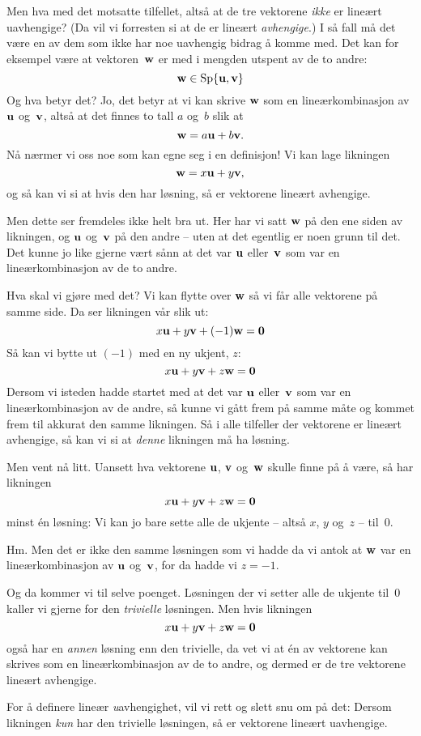 Men hva med det motsatte tilfellet, altså at de tre vektorene
\emph{ikke} er lineært uavhengige?  (Da vil vi forresten si at de er
lineært \emph{avhengige}.)  I så fall må det være en av dem som ikke
har noe uavhengig bidrag å komme med.  Det kan for eksempel være at
vektoren~$\mathbf{w}$ er med i mengden utspent av de to andre:
\[
\mathbf{w} \in \operatorname{Sp}\{ \mathbf{u}, \mathbf{v} \}
\]
Og hva betyr det?  Jo, det betyr at vi kan skrive $\mathbf{w}$ som en
lineærkombinasjon av $\mathbf{u}$ og~$\mathbf{v}$, altså at det finnes to tall $a$
og~$b$ slik at
\[
\mathbf{w} = a\mathbf{u} + b\mathbf{v}.
\]
Nå nærmer vi oss noe som kan egne seg i en definisjon!  Vi kan lage
likningen
\[
\mathbf{w} = x\mathbf{u} + y\mathbf{v},
\]
og så kan vi si at hvis den har løsning, så er vektorene lineært
avhengige.

Men dette ser fremdeles ikke helt bra ut.  Her har vi satt $\mathbf{w}$ på den
ene siden av likningen, og $\mathbf{u}$ og~$\mathbf{v}$ på den andre -- uten at det
egentlig er noen grunn til det.  Det kunne jo like gjerne vært sånn at
det var $\mathbf{u}$ eller~$\mathbf{v}$ som var en lineærkombinasjon av de to andre.

Hva skal vi gjøre med det?  Vi kan flytte over $\mathbf{w}$ så vi får alle
vektorene på samme side.  Da ser likningen vår slik ut:
\[
x \mathbf{u} + y \mathbf{v} + (-1) \mathbf{w} = \mathbf{0}
\]
Så kan vi bytte ut $(-1)$ med en ny ukjent, $z$:
\[
x \mathbf{u} + y \mathbf{v} + z \mathbf{w} = \mathbf{0}
\]
Dersom vi isteden hadde startet med at det var $\mathbf{u}$ eller~$\mathbf{v}$ som var
en lineærkombinasjon av de andre, så kunne vi gått frem på samme måte
og kommet frem til akkurat den samme likningen.  Så i alle tilfeller
der vektorene er lineært avhengige, så kan vi si at \emph{denne}
likningen må ha løsning.

Men vent nå litt.  Uansett hva vektorene $\mathbf{u}$, $\mathbf{v}$ og~$\mathbf{w}$ skulle
finne på å være, så har likningen
\[
x \mathbf{u} + y \mathbf{v} + z \mathbf{w} = \mathbf{0}
\]
minst én løsning: Vi kan jo bare sette alle de ukjente -- altså $x$,
$y$ og~$z$ -- til~$0$.

Hm.  Men det er ikke den samme løsningen som vi hadde da vi antok at
$\mathbf{w}$ var en lineærkombinasjon av $\mathbf{u}$ og~$\mathbf{v}$, for da hadde vi $z=-1$.

Og da kommer vi til selve poenget.  Løsningen der vi setter alle de
ukjente til~$0$ kaller vi gjerne for den \emph{trivielle} løsningen.
Men hvis likningen
\[
x \mathbf{u} + y \mathbf{v} + z \mathbf{w} = \mathbf{0}
\]
også har en \emph{annen} løsning enn den trivielle, da vet vi at én av
vektorene kan skrives som en lineærkombinasjon av de to andre, og
dermed er de tre vektorene lineært avhengige.

For å definere lineær \emph{u}avhengighet, vil vi rett og slett snu om
på det: Dersom likningen \emph{kun} har den trivielle løsningen, så er
vektorene lineært uavhengige.

